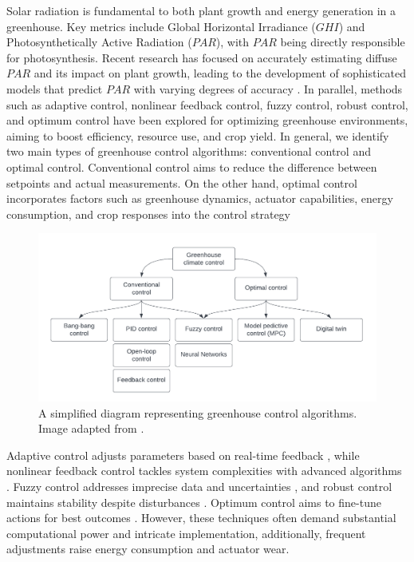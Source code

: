 \documentclass[conference]{IEEEtran}
\begin{document}
Solar radiation is fundamental to both plant growth and energy generation in a greenhouse. Key metrics include Global Horizontal Irradiance ($GHI$) and Photosynthetically Active Radiation ($PAR$), with $PAR$ being directly responsible for photosynthesis. Recent research has focused on accurately estimating diffuse $PAR$ and its impact on plant growth, leading to the development of sophisticated models that predict $PAR$ with varying degrees of accuracy \cite{Iddio2020, MaLu2022}. In parallel, methods such as adaptive control, nonlinear feedback control, fuzzy control, robust control, and optimum control have been explored for optimizing greenhouse environments, aiming to boost efficiency, resource use, and crop yield. In general, we identify two main types of greenhouse control algorithms: conventional control and optimal control. Conventional control aims to reduce the difference between setpoints and actual measurements. On the other hand, optimal control incorporates factors such as greenhouse dynamics, actuator capabilities, energy consumption, and crop responses into the control strategy

\begin{figure}
    \centering
    \includegraphics[width=.5\textwidth]{images/flowchart.pdf}
    \caption{A simplified diagram representing greenhouse control algorithms. Image adapted from \cite{10.1007/978-3-031-48649-4_13}.}
    \label{fig:flowchart}
\end{figure}

Adaptive control adjusts parameters based on real-time feedback \cite{Tian2022}, while nonlinear feedback control tackles system complexities with advanced algorithms \cite{Bood2023}. Fuzzy control addresses imprecise data and uncertainties \cite{smartcities7030055}, and robust control maintains stability despite disturbances \cite{Zhang2021}. Optimum control aims to fine-tune actions for best outcomes \cite{Debroy2024, SVENSEN2024108578}. However, these techniques often demand substantial computational power and intricate implementation, additionally, frequent adjustments raise energy consumption and actuator wear.
\end{document}
